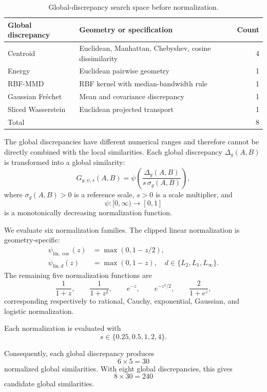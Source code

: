 \documentclass[preprint,12pt]{elsarticle}
\begin{document}
\begin{table}[!htbp]
\centering
\caption{Global-discrepancy search space before normalization.}
\label{tab:global-search-space}
\small
\begin{tabularx}{\linewidth}{lXr}
\toprule
Global discrepancy & Geometry or specification & Count\\
\midrule
Centroid
& Euclidean, Manhattan, Chebyshev, cosine dissimilarity
& 4\\
Energy
& Euclidean pairwise geometry
& 1\\
RBF-MMD
& RBF kernel with median-bandwidth rule
& 1\\
Gaussian Fr\'echet
& Mean and covariance discrepancy
& 1\\
Sliced Wasserstein
& Euclidean projected transport
& 1\\
\midrule
Total & & 8\\
\bottomrule
\end{tabularx}
\end{table}

The global discrepancies have different numerical ranges and therefore cannot
be directly combined with the local similarities. Each global
discrepancy $\Delta_g(A,B)$ is transformed into a global similarity:
\begin{equation}
G_{g,\psi,s}(A,B)
=
\psi\!\left(
\frac{
\Delta_g(A,B)
}{
s\,\sigma_g(A,B)
}
\right),
\label{eq:global}
\end{equation}
where $\sigma_g(A,B)>0$ is a reference scale, $s>0$ is a scale multiplier,
and
\[
\psi:[0,\infty)\rightarrow[0,1]
\]
is a monotonically decreasing normalization function.

We evaluate six normalization families. The clipped linear normalization is
geometry-specific:
\begin{align}
\psi_{\mathrm{lin},\cos}(z)&=\max(0,1-z/2),\\
\psi_{\mathrm{lin},d}(z)&=\max(0,1-z),
\quad d\in\{L_2,L_1,L_\infty\}.
\end{align}
The remaining five normalization functions are
\[
\frac{1}{1+z},\qquad
\frac{1}{1+z^2},\qquad
e^{-z},\qquad
e^{-z^2/2},\qquad
\frac{2}{1+e^z},
\]
corresponding respectively to rational, Cauchy, exponential, Gaussian, and
logistic normalization.

Each normalization is evaluated with
\[
s\in\{0.25,0.5,1,2,4\}.
\]

Consequently, each global discrepancy produces
\[
6\times5=30
\]
normalized global similarities. With eight global discrepancies, this gives
\[
8\times30=240
\]
candidate global similarities.
\end{document}
